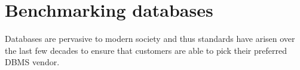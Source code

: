 \section{Benchmarking databases}
Databases are pervasive to modern society and thus standards have arisen over
the last few decades to ensure that customers are able to pick their preferred
DBMS vendor.
